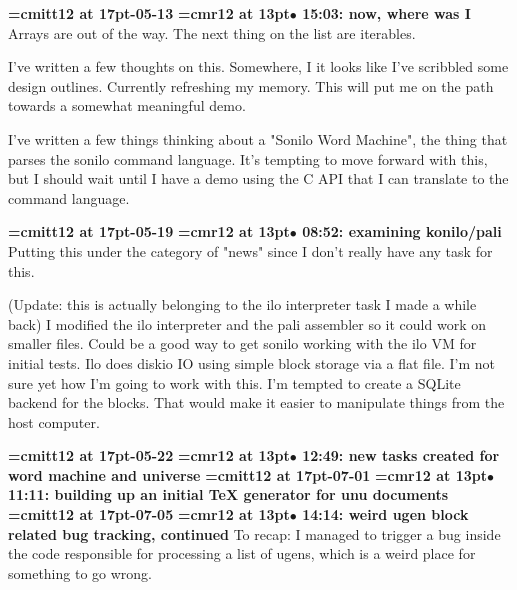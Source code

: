 {\medskip\noindent\bf\font\titlefont=cmitt12 at 17pt-05-13}\medskip
{\smallskip\noindent\bf\font\titlefont=cmr12 at 13pt\titlefont $\bullet$ 15:03: now, where was I}\smallskip
Arrays are out of the way. The next thing on the list are iterables.
\par

I've written a few thoughts on this. Somewhere, I it looks like I've scribbled some design outlines. Currently refreshing my memory. This will put me on the path towards a somewhat meaningful demo.
\par

I've written a few things thinking about a "Sonilo Word Machine", the thing that parses the sonilo command language. It's tempting to move forward with this, but I should wait until I have a demo using the C API that I can translate to the command language.
\par

{\medskip\noindent\bf\font\titlefont=cmitt12 at 17pt-05-19}\medskip
{\smallskip\noindent\bf\font\titlefont=cmr12 at 13pt\titlefont $\bullet$ 08:52: examining konilo/pali}\smallskip
Putting this under the category of "news" since I don't really have any task for this.
\par

(Update: this is actually belonging to the ilo interpreter task I made a while back) I modified the ilo interpreter and the pali assembler so it could work on smaller files. Could be a good way to get sonilo working with the ilo VM for initial tests. Ilo does diskio IO using simple block storage via a flat file. I'm not sure yet how I'm going to work with this. I'm tempted to create a SQLite backend for the blocks. That would make it easier to manipulate things from the host computer.
\par

{\medskip\noindent\bf\font\titlefont=cmitt12 at 17pt-05-22}\medskip
{\smallskip\noindent\bf\font\titlefont=cmr12 at 13pt\titlefont $\bullet$ 12:49: new tasks created for word machine and universe}\smallskip
{\medskip\noindent\bf\font\titlefont=cmitt12 at 17pt-07-01}\medskip
{\smallskip\noindent\bf\font\titlefont=cmr12 at 13pt\titlefont $\bullet$ 11:11: building up an initial TeX generator for unu documents}\smallskip
{\medskip\noindent\bf\font\titlefont=cmitt12 at 17pt-07-05}\medskip
{\smallskip\noindent\bf\font\titlefont=cmr12 at 13pt\titlefont $\bullet$ 14:14: weird ugen block related bug tracking, continued}\smallskip
To recap: I managed to trigger a bug inside the code responsible for processing a list of ugens, which is a weird place for something to go wrong.
\par

